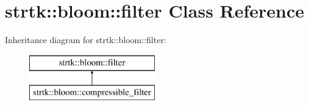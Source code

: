 \hypertarget{classstrtk_1_1bloom_1_1filter}{\section{strtk\-:\-:bloom\-:\-:filter Class Reference}
\label{classstrtk_1_1bloom_1_1filter}
}
Inheritance diagram for strtk\-:\-:bloom\-:\-:filter\-:\begin{figure}[H]
\begin{center}
\leavevmode
\includegraphics[height=2.000000cm]{classstrtk_1_1bloom_1_1filter}
\end{center}
\end{figure}
